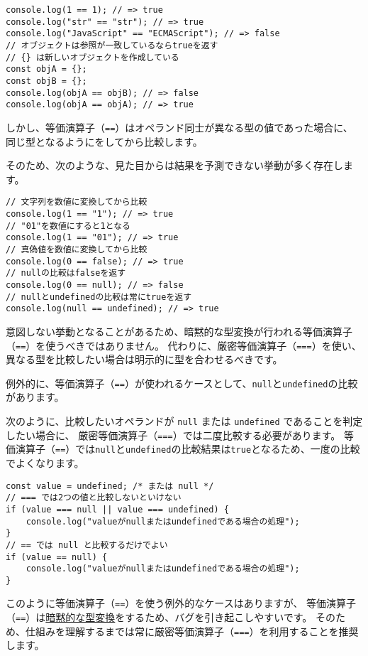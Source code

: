 \begin{lstlisting}
console.log(1 == 1); // => true
console.log("str" == "str"); // => true
console.log("JavaScript" == "ECMAScript"); // => false
// オブジェクトは参照が一致しているならtrueを返す
// {} は新しいオブジェクトを作成している
const objA = {};
const objB = {};
console.log(objA == objB); // => false
console.log(objA == objA); // => true
\end{lstlisting}

しかし、等価演算子（\texttt{==}）はオペランド同士が異なる型の値であった場合に、
同じ型となるように\textbf{}をしてから比較します。

そのため、次のような、見た目からは結果を予測できない挙動が多く存在します。

\begin{lstlisting}
// 文字列を数値に変換してから比較
console.log(1 == "1"); // => true
// "01"を数値にすると1となる
console.log(1 == "01"); // => true
// 真偽値を数値に変換してから比較
console.log(0 == false); // => true
// nullの比較はfalseを返す
console.log(0 == null); // => false
// nullとundefinedの比較は常にtrueを返す
console.log(null == undefined); // => true
\end{lstlisting}

意図しない挙動となることがあるため、暗黙的な型変換が行われる等価演算子（\texttt{==}）を使うべきではありません。
代わりに、厳密等価演算子（\texttt{===}）を使い、異なる型を比較したい場合は明示的に型を合わせるべきです。

例外的に、等価演算子（\texttt{==}）が使われるケースとして、\texttt{null}と\texttt{undefined}の比較があります。

次のように、比較したいオペランドが \texttt{null} または
\texttt{undefined} であることを判定したい場合に、
厳密等価演算子（\texttt{===}）では二度比較する必要があります。
等価演算子（\texttt{==}）では\texttt{null}と\texttt{undefined}の比較結果は\texttt{true}となるため、一度の比較でよくなります。

\begin{lstlisting}
const value = undefined; /* または null */
// === では2つの値と比較しないといけない
if (value === null || value === undefined) {
    console.log("valueがnullまたはundefinedである場合の処理");
}
// == では null と比較するだけでよい
if (value == null) {
    console.log("valueがnullまたはundefinedである場合の処理");
}
\end{lstlisting}

このように等価演算子（\texttt{==}）を使う例外的なケースはありますが、
等価演算子（\texttt{==}）は\hyperlink{implicit-coercion}{暗黙的な型変換}をするため、バグを引き起こしやすいです。
そのため、仕組みを理解するまでは常に厳密等価演算子（\texttt{===}）を利用することを推奨します。

